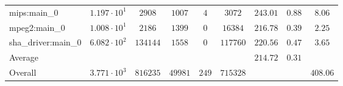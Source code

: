 \begin{tabular}{|l|c|c|c|c|c|c|c|c|}
mips:main\_0            & $ 1.197 \cdot 10^{1}  $ & $ 2908   $ & $ 1007  $ & $ 4   $ & $ 3072   $ & $ 243.01      $ & $ 0.88    $ & $ 8.06    $ \\
mpeg2:main\_0           & $ 1.008 \cdot 10^{1}  $ & $ 2186   $ & $ 1399  $ & $ 0   $ & $ 16384  $ & $ 216.78      $ & $ 0.39    $ & $ 2.25    $ \\
sha\_driver:main\_0     & $ 6.082 \cdot 10^{2}  $ & $ 134144 $ & $ 1558  $ & $ 0   $ & $ 117760 $ & $ 220.56      $ & $ 0.47    $ & $ 3.65    $ \\
\hline
Average                 & $                     $ & $        $ & $       $ & $     $ & $        $ & $ 214.72      $ & $ 0.31    $ & $         $ \\
\hline
Overall                 & $ 3.771 \cdot 10^{3}  $ & $ 816235 $ & $ 49981 $ & $ 249 $ & $ 715328 $ & $             $ & $         $ & $ 408.06  $ \\
\hline
\end{tabular}
